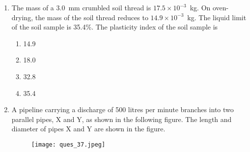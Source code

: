 \documentclass[journal]{IEEEtran}
\numberwithin{equation}{enumi}
\numberwithin{figure}{enumi}
\begin{document}
\begin{enumerate}
    \textbf{Group I}\hspace{4cm}\textbf{Group II}\\
    i. Slider crank mechanism \hspace{1.75cm} a. Tractor steering\\
    ii. Four bar linkage mechanism \hspace{1cm} b. Attachment of pitman to knife head\\
    iii. Ball and socket joint \hspace{2cm} c. Planting unit of rice transplanter\\
    iv. Worm and roller type unit \hspace{1.25cm} d. Vertical conveyor reaper
     \hfill{}
\begin{multicols}{2}
    \begin{enumerate}
    \item i-d, ii-c, iii-b, iv-a
    \item i-b, ii-c, iii-a, iv-d
    \item i-c, ii-a, iii-d, iv-b
    \item i-b, ii-c, iii-a, iv-d
    \end{enumerate}
    \end{multicols}  
    
   

    \item The mass of a 3.0~mm crumbled soil thread is \(17.5 \times 10^{-3}\)~kg. On oven-drying, the mass of the soil thread reduces to \(14.9 \times 10^{-3}\)~kg. The liquid limit of the soil sample is 35.4\%. The plasticity index of the soil sample is
     \hfill{}
\begin{multicols}{4}
    \begin{enumerate}
    \item 14.9 
    \item 18.0
    \item 32.8
    \item 35.4
    \end{enumerate}
    \end{multicols}  
    

    
    \item A pipeline carrying a discharge of 500 litres per minute branches into two parallel pipes, X and Y, as shown in the following figure. The length and diameter of pipes X and Y are shown in the figure.  \hfill{}
\begin{figure}[ht!]
    \centering
    \texttt{[image: ques\_37.jpeg]}
    \caption{}
    \label{fig:proj32.jpeg}
\end{figure}


\end{enumerate}
\end{document}
